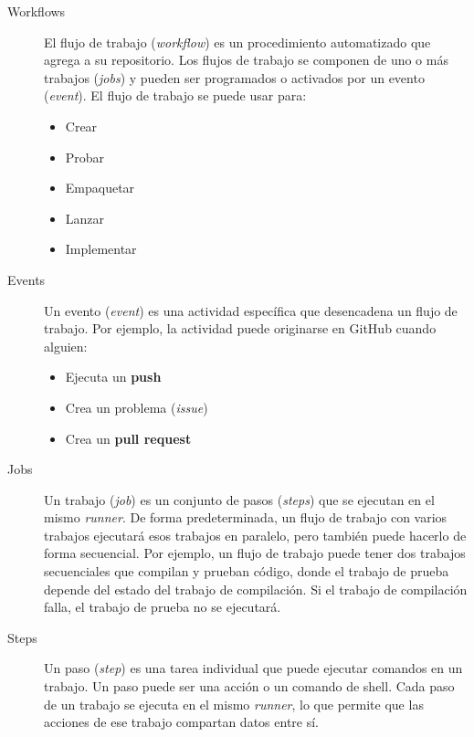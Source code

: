 \documentclass[twoside,twocolumn]{article}
\begin{document}
\begin{description}
    
    \item[Workflows]
    El flujo de trabajo (\textit{workflow}) es un procedimiento automatizado que agrega a su repositorio. Los flujos de trabajo se componen de uno o más trabajos (\textit{jobs}) y pueden ser programados o activados por un evento (\textit{event}). El flujo de trabajo se puede usar para:
    
    \begin{itemize}
        \item Crear
        \item Probar
        \item Empaquetar
        \item Lanzar
        \item Implementar
    \end{itemize}

    \item[Events]
    Un evento (\textit{event}) es una actividad específica que desencadena un flujo de trabajo. Por ejemplo, la actividad puede originarse en GitHub cuando alguien:

    \begin{itemize}
        \item Ejecuta un \textbf{push}
        \item Crea un problema (\textit{issue})
        \item Crea un \textbf{pull request}
    \end{itemize}

    \item[Jobs]
    Un trabajo (\textit{job}) es un conjunto de pasos (\textit{steps}) que se ejecutan en el mismo \textit{runner}. De forma predeterminada, un flujo de trabajo con varios trabajos ejecutará esos trabajos en paralelo, pero también puede hacerlo de forma secuencial. Por ejemplo, un flujo de trabajo puede tener dos trabajos secuenciales que compilan y prueban código, donde el trabajo de prueba depende del estado del trabajo de compilación. Si el trabajo de compilación falla, el trabajo de prueba no se ejecutará.

    \item[Steps]
    Un paso (\textit{step}) es una tarea individual que puede ejecutar comandos en un trabajo. Un paso puede ser una acción o un comando de shell. Cada paso de un trabajo se ejecuta en el mismo \textit{runner}, lo que permite que las acciones de ese trabajo compartan datos entre sí.


\end{description}
\end{document}
